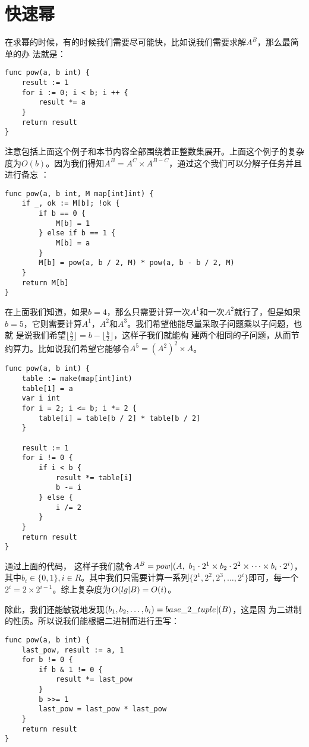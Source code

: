 
\section{快速幂}

在求幂的时候，有的时候我们需要尽可能快，比如说我们需要求解$A^B$，那么最简单的办
法就是：
\begin{lstlisting}
func pow(a, b int) {
    result := 1
    for i := 0; i < b; i ++ {
        result *= a
    }
    return result
}
\end{lstlisting}

注意包括上面这个例子和本节内容全部围绕着正整数集展开。上面这个例子的复杂度为$O(
b)$。因为我们得知$A^B=A^C\times A^{B-C}$，通过这个我们可以分解子任务并且进行备忘
：
\begin{lstlisting}
func pow(a, b int, M map[int]int) {
    if _, ok := M[b]; !ok {
        if b == 0 {
            M[b] = 1
        } else if b == 1 {
            M[b] = a
        }
        M[b] = pow(a, b / 2, M) * pow(a, b - b / 2, M)
    }
    return M[b]
}
\end{lstlisting}

在上面我们知道，如果$b=4$，那么只需要计算一次$A^1$和一次$A^2$就行了，但是如果$b
=5$，它则需要计算$A^1$，$A^2$和$A^3$。我们希望他能尽量采取子问题乘以子问题，也就
是说我们希望$\lfloor\frac b2\rfloor=b-\lfloor\frac b2\rfloor$，这样子我们就能构
建两个相同的子问题，从而节约算力。比如说我们希望它能够令$A^5=(A^2)^2\times A$。
\begin{lstlisting}
func pow(a, b int) {
    table := make(map[int]int)
    table[1] = a
    var i int
    for i = 2; i <= b; i *= 2 {
        table[i] = table[b / 2] * table[b / 2]
    }

    result := 1
    for i != 0 {
        if i < b {
            result *= table[i]
            b -= i
        } else {
            i /= 2
        }
    }
    return result
}
\end{lstlisting}

通过上面的代码，
这样子我们就令$A^B=\*pow|(A, \  b_1\cdot 2^1\times b_2\cdot 2^2\times\cdots\times
b_i\cdot 2^i)$，其中$b_i\in\{0, 1\}, i\in R$。其中我们只需要计算一系列$\{2^1, 2
^2, 2^3, \ldots, 2^i\}$即可，每一个$2^i=2\times 2^{i-1}$。综上复杂度为$O(\*lg |
B)=O(i)$。

除此，我们还能敏锐地发现$(b_1, b_2, \ldots, b_i)=\*base\_2\_tuple|(B)$，这是因
为二进制的性质。所以说我们能根据二进制而进行重写：
\begin{lstlisting}
func pow(a, b int) {
    last_pow, result := a, 1
    for b != 0 {
        if b & 1 != 0 {
            result *= last_pow
        }
        b >>= 1
        last_pow = last_pow * last_pow
    }
    return result
}
\end{lstlisting}

